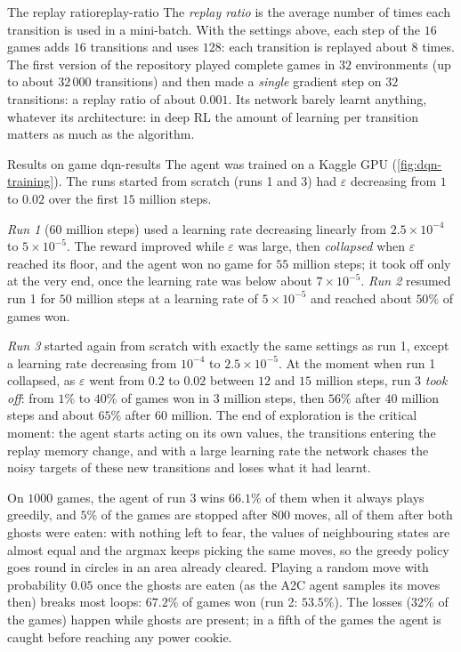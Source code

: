 \begin{remark}{The replay ratio}{replay-ratio}
  The \emph{replay ratio} is the average number of times each transition
  is used in a mini-batch. With the settings above, each step of the $16$
  games adds $16$ transitions and uses $128$: each transition is replayed
  about $8$ times. The first version of the repository played complete
  games in $32$ environments (up to about $32\,000$ transitions) and then
  made a \emph{single} gradient step on $32$ transitions: a replay ratio of
  about $0.001$. Its network barely learnt anything, whatever its
  architecture: in deep RL the amount of learning per transition matters as
  much as the algorithm.
\end{remark}

\begin{pacman}{Results on game }{dqn-results}
  The agent was trained on a Kaggle GPU (\cref{fig:dqn-training}). The
  runs started from scratch (runs 1 and 3) had $\varepsilon$ decreasing
  from $1$ to $0.02$ over the first $15$ million steps.

  \emph{Run 1} ($60$ million steps) used a learning rate decreasing
  linearly from $2.5 \times 10^{-4}$ to $5 \times 10^{-5}$. The reward
  improved while $\varepsilon$ was large, then \emph{collapsed} when
  $\varepsilon$ reached its floor, and the agent won no game for $55$
  million steps; it took off only at the very end, once the learning rate
  was below about $7 \times 10^{-5}$. \emph{Run 2} resumed run 1 for $50$
  million steps at a learning rate of $5 \times 10^{-5}$ and reached about
  $50\%$ of games won.

  \emph{Run 3} started again from scratch with exactly the same settings
  as run 1, except a learning rate decreasing from $10^{-4}$ to $2.5 \times
  10^{-5}$. At the moment when run 1 collapsed, as $\varepsilon$
  went from $0.2$ to $0.02$ between $12$ and $15$ million steps, run 3
  \emph{took off}: from $1\%$ to $40\%$ of games won in $3$ million steps,
  then $56\%$ after $40$ million steps and about $65\%$ after $60$
  million. The end of exploration is the critical moment: the agent starts
  acting on its own values, the transitions entering the replay memory
  change, and with a large learning rate the network chases the noisy
  targets of these new transitions and loses what it had learnt.

  On $1000$ games, the agent of run 3 wins $66.1\%$ of them when it always
  plays greedily, and $5\%$ of the games are stopped after $800$ moves,
  all of them after both ghosts were eaten: with nothing left to fear, the
  values of neighbouring states are almost equal and the argmax keeps
  picking the same moves, so the greedy policy goes round in circles in an
  area already cleared. Playing a random move with probability $0.05$ once
  the ghosts are eaten (as the A2C agent samples its moves then) breaks
  most loops: $67.2\%$ of games won (run 2: $53.5\%$). The losses ($32\%$
  of the games) happen while ghosts are present; in a fifth of the games
  the agent is caught before reaching any power cookie.


\end{pacman}
